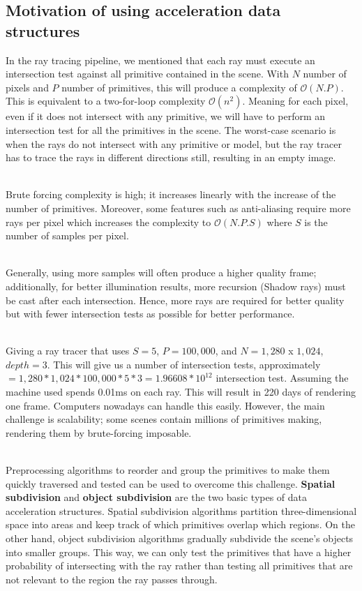 \documentclass[11pt,a4paper]{article}
\begin{document}
\subsection{Motivation of using acceleration data structures}
In the ray tracing pipeline, we mentioned that each ray must execute an intersection test against all primitive contained in the scene. With $N$ number of pixels and $P$ number of primitives, this will produce a complexity of $\mathcal{O}(N.P)$. This is equivalent to a two-for-loop complexity $\mathcal{O}(n^2)$. Meaning for each pixel, even if it does not intersect with any primitive, we will have to perform an intersection test for all the primitives in the scene. The worst-case scenario is when the rays do not intersect with any primitive or model, but the ray tracer has to trace the rays in different directions still, resulting in an empty image. 

\noindent
\\
Brute forcing complexity is high; it increases linearly with the increase of the number of primitives. Moreover, some features such as anti-aliasing require more rays per pixel which increases the complexity to  $\mathcal{O}(N.P.S)$ where $S$ is the number of samples per pixel. 

\noindent
\\
Generally, using more samples will often produce a higher quality frame; additionally, for better illumination results, more recursion (Shadow rays) must be cast after each intersection. Hence, more rays are required for better quality but with fewer intersection tests as possible for better performance.

\noindent
\\
Giving a ray tracer that uses $S = 5$, $P = 100, 000$, and $N =  1, 280 $ x $1, 024$, $depth = 3$. This will give us a number of intersection tests, approximately $= 1, 280 * 1, 024 * 100, 000 * 5 * 3 = 1.96608*10^{12} $ intersection test. Assuming the machine used spends 0.01ms on each ray. This will result in 220 days of rendering one frame. Computers nowadays can handle this easily. However, the main challenge is scalability; some scenes contain millions of primitives making, rendering them by brute-forcing imposable.

\noindent
\\ 
Preprocessing algorithms to reorder and group the primitives to make them quickly traversed and tested can be used to overcome this challenge. \textbf{Spatial subdivision} and \textbf{object subdivision} are the two basic types of data acceleration structures. Spatial subdivision algorithms partition three-dimensional space into areas and keep track of which primitives overlap which regions. On the other hand, object subdivision algorithms gradually subdivide the scene's objects into smaller groups. This way, we can only test the primitives that have a higher probability of intersecting with the ray rather than testing all primitives that are not relevant to the region the ray passes through. 
\end{document}
